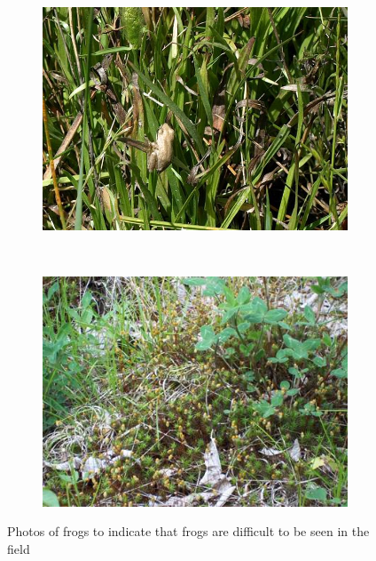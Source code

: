 \begin{figure}[htb!]
\centering
      \begin{subfigure}[b]{0.5\textwidth}
           \includegraphics[width=1\textwidth,height=0.75\textwidth]{image/unseen_frog_1.jpg}
    \end{subfigure}%
	~~
	      \begin{subfigure}[b]{0.5\textwidth}
           \includegraphics[width=1\textwidth,height=0.75\textwidth]{image/unseen_frog_2.jpg}
    \end{subfigure}%
\caption[Photos of frogs]{Photos of frogs to indicate that frogs are difficult to be seen in the field}
\label{fig:Ch1_frogs}       %
\end{figure}



